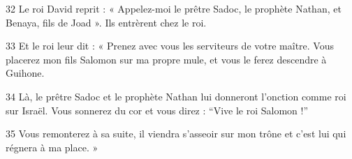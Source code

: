 
32 Le roi David reprit : « Appelez-moi le prêtre Sadoc, le prophète Nathan, et Benaya, fils de Joad ». Ils entrèrent chez le roi.

33 Et le roi leur dit : « Prenez avec vous les serviteurs de votre maître. Vous placerez mon fils Salomon sur ma propre mule, et vous le ferez descendre à Guihone.

34 Là, le prêtre Sadoc et le prophète Nathan lui donneront l’onction comme roi sur Israël. Vous sonnerez du cor et vous direz : “Vive le roi Salomon !”

35 Vous remonterez à sa suite, il viendra s’asseoir sur mon trône et c’est lui qui régnera à ma place. »
